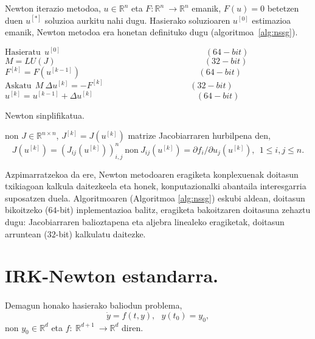 Newton iterazio metodoa, $u\in \mathbb{R}^{n}$ eta $F: \mathbb{R}^n \ \longrightarrow {\mathbb{R}}^n$ emanik, $F(u)=0$ betetzen duen $u^{[*]}$ soluzioa aurkitu nahi dugu. Hasierako soluzioaren $u^{[0]}$ estimazioa  emanik,  Newton metodoa era honetan definituko dugu (algoritmoa~\ref{alg:nssg}).

\begin{algorithm}[H]
  \BlankLine
  $ \text{Hasieratu} \ \ u^{[0]}   \quad \quad \quad \quad \quad \quad \quad \quad\quad \quad \quad \quad \quad \quad \quad \quad \quad    (64-bit)$\;
  $M=LU(J) \ \ \quad \quad \quad \quad \quad \quad \quad \quad\quad \quad \quad \quad \quad \quad \quad \quad \quad    (32-bit)$\;
  {
   \BlankLine
   $F^{[k]}=F(u^{[k-1]}) \  \quad \ \quad \quad \quad \quad \quad \quad \quad \quad \quad \quad \quad \quad \ \   (64-bit)$\;
   $\text{Askatu} \ \ M \ \Delta u^{[k]}=- F^{[k]} \ \quad \ \quad \quad \quad \quad \quad \quad \quad \quad \ \ \  (32-bit)$\;
   \BlankLine
   $u^{[k]}=u^{[k-1]}+\Delta u^{[k]}  \ \ \ \quad \quad \quad \quad\quad \quad \quad \quad \quad \quad \quad \ \     (64-bit)$\;
  }
 \caption{Newton sinplifikatua.}
 \label{alg:nssg}
\end{algorithm}

non $J \in \mathbb{R}^{n \times n}$, $J^{[k]}=J(u^{[k]})$ matrize Jacobiarraren hurbilpena den,
\begin{equation*}
J(u^{[k]})=(J_{ij}(u^{[k]}))_{i,j}^n \ \text{non} \ J_{ij}(u^{[k]})=\partial f_i/\partial u_j (u^{[k]}), \ \ 1 \leq i,j \leq n. 
\end{equation*} 


Azpimarratzekoa da ere, Newton metodoaren eragiketa konplexuenak doitasun txikiagoan kalkula daitezkeela \cite{Baboulin20092526} eta honek, konputazionalki abantaila interesgarria suposatzen duela. Algoritmoaren (Algoritmoa \ref{alg:nssg}) eskubi aldean, doitasun bikoitzeko ($64$-bit) inplementazioa balitz, eragiketa bakoitzaren doitasuna zehaztu dugu: Jacobiarraren balioztapena eta aljebra linealeko eragiketak, doitasun arruntean ($32$-bit) kalkulatu daitezke.


\section{IRK-Newton estandarra.}

\paragraph*{}Demagun honako hasierako baliodun problema,
\begin{equation}
\label{eq:hbp}
\dot{y}=f(t,y),\ \ \ y(t_0)=y_0, 
\end{equation}
non  $y_0 \in \mathbb{R}^{d}$  eta $f: \  {\mathbb{R}}^{d+1} \ \longrightarrow {\mathbb{R}}^d$ diren. 

